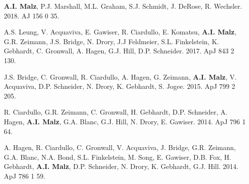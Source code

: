 \begin{list}{\pubnumber{\therefpubnum}}{\malzlist}
\item {\bf A.I. Malz}, P.J. Marshall, %
M.L. Graham, S.J. Schmidt, J. DeRose, R. Wechsler. 
2018. AJ 156 0 35. 
  

\item A.S. Leung, V. Acquaviva, E. Gawiser, R. Ciardullo, E. Komatsu, {\bf A.I. Malz}, G.R. Zeimann, %
J.S. Bridge, N. Drory, J.J Feldmeier, S.L. Finkelstein, K. Gebhardt, C. Gronwall, A. Hagen, G.J. Hill, D.P. Schneider. 
2017. ApJ 843 2 130. 

\item J.S. Bridge, C. Gronwall, R. Ciardullo, A. Hagen, G. Zeimann, {\bf A.I. Malz}, V. Acquaviva, D.P. Schneider, N. Drory, K. Gebhardt, S. Jogee. 2015. ApJ 799 2 205. 

\item R. Ciardullo, G.R. Zeimann, C. Gronwall, H. Gebhardt, D.P. Schneider, A. Hagen, {\bf A.I. Malz}, G.A. Blanc, G.J. Hill, N. Drory, E. Gawiser. 2014. ApJ 796 1 64. 

\item A. Hagen, R. Ciardullo, C. Gronwall, V. Acquaviva, J. Bridge, G.R. Zeimann, G.A. Blanc, N.A. Bond, S.L. Finkelstein, M. Song, E. Gawiser, D.B. Fox, H. Gebhardt, {\bf A.I. Malz}, D.P. Schneider, N. Drory, K. Gebhardt, G.J. Hill. 2014. ApJ 786 1 59. 
  
\end{list}


